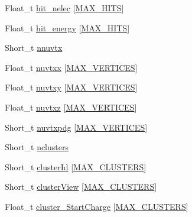 \begin{DoxyCompactItemize}
\item 
Float\-\_\-t \hyperlink{classanatree_a422a1eb463bc395d117a4e2e6dc2b4ba}{hit\-\_\-nelec} \mbox{[}\hyperlink{anatree__core__v09410002_8h_a817cc372e529c6dcaa3116b2782203df}{M\-A\-X\-\_\-\-H\-I\-T\-S}\mbox{]}
\item 
Float\-\_\-t \hyperlink{classanatree_acde23195130ed65218a46955bd79a8f3}{hit\-\_\-energy} \mbox{[}\hyperlink{anatree__core__v09410002_8h_a817cc372e529c6dcaa3116b2782203df}{M\-A\-X\-\_\-\-H\-I\-T\-S}\mbox{]}
\item 
Short\-\_\-t \hyperlink{classanatree_a72c05e2c01f85575b911ccd47060bfbd}{nnuvtx}
\item 
Float\-\_\-t \hyperlink{classanatree_ae396ae06e085b0021c54968668519b1b}{nuvtxx} \mbox{[}\hyperlink{anatree__core__v09410002_8h_a6ac49acb0970e608315ca232a9fc8828}{M\-A\-X\-\_\-\-V\-E\-R\-T\-I\-C\-E\-S}\mbox{]}
\item 
Float\-\_\-t \hyperlink{classanatree_af7bc58e94bad55538d5d72697de485d6}{nuvtxy} \mbox{[}\hyperlink{anatree__core__v09410002_8h_a6ac49acb0970e608315ca232a9fc8828}{M\-A\-X\-\_\-\-V\-E\-R\-T\-I\-C\-E\-S}\mbox{]}
\item 
Float\-\_\-t \hyperlink{classanatree_a8b24134ada26040c2c70bc0aa7f8732a}{nuvtxz} \mbox{[}\hyperlink{anatree__core__v09410002_8h_a6ac49acb0970e608315ca232a9fc8828}{M\-A\-X\-\_\-\-V\-E\-R\-T\-I\-C\-E\-S}\mbox{]}
\item 
Short\-\_\-t \hyperlink{classanatree_a9202f57b945c52d6579fc9ec9938829a}{nuvtxpdg} \mbox{[}\hyperlink{anatree__core__v09410002_8h_a6ac49acb0970e608315ca232a9fc8828}{M\-A\-X\-\_\-\-V\-E\-R\-T\-I\-C\-E\-S}\mbox{]}
\item 
Short\-\_\-t \hyperlink{classanatree_a0b190f9cf843aa1aa7d2c0cccf1addeb}{nclusters}
\item 
Short\-\_\-t \hyperlink{classanatree_a473ab2c02b36fd4cae6aed6e9da33f32}{cluster\-Id} \mbox{[}\hyperlink{anatree__core__v09410002_8h_a7250daa0fff832693cecd6907e64f6ec}{M\-A\-X\-\_\-\-C\-L\-U\-S\-T\-E\-R\-S}\mbox{]}
\item 
Short\-\_\-t \hyperlink{classanatree_a48678b60b63909c9e0a1d33088c7293f}{cluster\-View} \mbox{[}\hyperlink{anatree__core__v09410002_8h_a7250daa0fff832693cecd6907e64f6ec}{M\-A\-X\-\_\-\-C\-L\-U\-S\-T\-E\-R\-S}\mbox{]}
\item 
Float\-\_\-t \hyperlink{classanatree_a793a4a4bae0507a4ba0e9792a76c15f9}{cluster\-\_\-\-Start\-Charge} \mbox{[}\hyperlink{anatree__core__v09410002_8h_a7250daa0fff832693cecd6907e64f6ec}{M\-A\-X\-\_\-\-C\-L\-U\-S\-T\-E\-R\-S}\mbox{]}
\item 

\end{DoxyCompactItemize}
